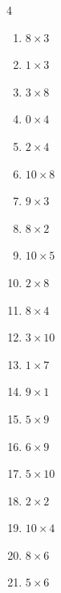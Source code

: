 \begin{multicols}{4}
\begin{enumerate}
  \item $8\times 3$
        \phantom{$=24$}

  \item $1\times 3$
        \phantom{$=3$}

  \item $3\times 8$
        \phantom{$=24$}

  \item $0\times 4$
        \phantom{$=0$}

  \item $2\times 4$
        \phantom{$=8$}

  \item $10\times 8$
        \phantom{$=80$}

  \item $9\times 3$
        \phantom{$=27$}

  \item $8\times 2$
        \phantom{$=16$}

\columnbreak %

  \item $10\times 5$
        \phantom{$=50$}

  \item $2\times 8$
        \phantom{$=16$}

  \item $8\times 4$
        \phantom{$=32$}

  \item $3\times 10$
        \phantom{$=30$}

  \item $1\times 7$
        \phantom{$=7$}

  \item $9\times 1$
        \phantom{$=9$}

  \item $5\times 9$
        \phantom{$=45$}

  \item $6\times 9$
        \phantom{$=54$}

  \item $5\times 10$
        \phantom{$=50$}

  \item $2\times 2$
        \phantom{$=4$}

  \item $10\times 4$
        \phantom{$=40$}

  \item $8\times 6$
        \phantom{$=48$}

  \item $5\times 6$
        \phantom{$=30$}


\end{enumerate}
\end{multicols}
